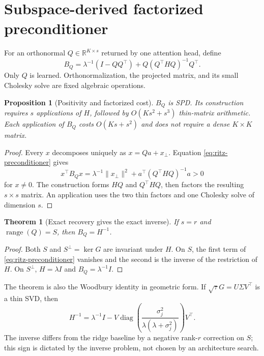 \documentclass[11pt]{article}
\newtheorem{theorem}{Theorem}
\newtheorem{proposition}{Proposition}
\newcommand{\R}{\mathbb R}
\newcommand{\range}{\operatorname{range}}
\begin{document}
\section{Subspace-derived factorized preconditioner}

For an orthonormal $Q\in\R^{K\times s}$ returned by one attention head, define
\begin{equation}
 B_Q=\lambda^{-1}(I-QQ^\top)
 +Q(Q^\top H Q)^{-1}Q^\top .
 \label{eq:ritz-preconditioner}
\end{equation}
Only $Q$ is learned.  Orthonormalization, the projected matrix, and its small
Cholesky solve are fixed algebraic operations.

\begin{proposition}[Positivity and factorized cost]
$B_Q$ is SPD.  Its construction requires $s$ applications of $H$, followed
by $O(Ks^2+s^3)$ thin-matrix arithmetic.  Each application of $B_Q$ costs
$O(Ks+s^2)$ and does not require a dense $K\times K$ matrix.
\end{proposition}
\begin{proof}
Every $x$ decomposes uniquely as $x=Qa+x_\perp$.  Equation
\eqref{eq:ritz-preconditioner} gives
\[
 x^\top B_Qx=\lambda^{-1}\|x_\perp\|^2
 +a^\top(Q^\top H Q)^{-1}a>0
\]
for $x\ne0$.  The construction forms $HQ$ and $Q^\top HQ$, then factors the
resulting $s\times s$ matrix.  An application uses the two thin factors and
one Cholesky solve of dimension $s$.
\end{proof}

\begin{theorem}[Exact recovery gives the exact inverse]
If $s=r$ and $\range(Q)=S$, then $B_Q=H^{-1}$.
\label{thm:exact-subspace}
\end{theorem}
\begin{proof}
Both $S$ and $S^\perp=\ker G$ are invariant under $H$.  On $S$, the first term
of \eqref{eq:ritz-preconditioner} vanishes and the second is the inverse of the
restriction of $H$.  On $S^\perp$, $H=\lambda I$ and $B_Q=\lambda^{-1}I$.
\end{proof}

The theorem is also the Woodbury identity in geometric form.  If
$\sqrt\tau G=U\Sigma V^\top$ is a thin SVD, then
\[
 H^{-1}=\lambda^{-1}I-
 V\operatorname{diag}\!\left(
 \frac{\sigma_j^2}{\lambda(\lambda+\sigma_j^2)}
 \right)V^\top .
\]
The inverse differs from the ridge baseline by a negative rank-$r$ correction
on $S$; this sign is dictated by the inverse problem, not chosen by an
architecture search.
\end{document}
